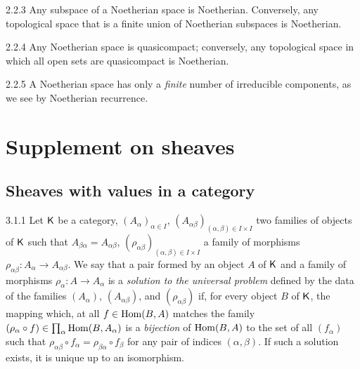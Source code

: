 \documentclass{book}
\begin{document}
\begin{env}{2.2.3}
\label{env-0.2.2.3}
Any subspace of a Noetherian space is Noetherian. Conversely,
any topological space that is a finite union of Noetherian subspaces is Noetherian.
\end{env}

\begin{env}{2.2.4}
\label{env-0.2.2.4}
Any Noetherian space is quasicompact; conversely, any  topological space in which all
open sets are quasicompact is Noetherian.
\end{env}

\begin{env}{2.2.5}
\label{env-0.2.2.5}
A Noetherian space has only a \emph{finite} number of irreducible components,
as we see by Noetherian recurrence.
\end{env}

\section{Supplement on sheaves}
\label{0-prelim-3}

\subsection{Sheaves with values in a category}
\label{0-prelim-3.1}

\begin{env}{3.1.1}
\label{env-0.3.1.1}
Let $\mathsf{K}$ be a category, $(A_\alpha)_{\alpha\in I}$,
$(A_{\alpha\beta})_{(\alpha,\beta)\in I\times I}$ two families of objects
of $\mathsf{K}$ such that $A_{\beta\alpha}=A_{\alpha\beta}$,
$(\rho_{\alpha\beta})_{(\alpha,\beta)\in I\times I}$ a family of morphisms
$\rho_{\alpha\beta}\colon A_\alpha\to A_{\alpha\beta}$. We say that a pair formed by
an object $A$ of $\mathsf{K}$ and a family of morphisms $\rho_\alpha\colon A\to A_\alpha$ 
is a \emph{solution to the universal problem} defined by the data of the families
$(A_\alpha)$, $(A_{\alpha\beta})$, and $(\rho_{\alpha\beta})$ if, for every object $B$
of $\mathsf{K}$, the mapping which, at all $f\in{\mathop{\mathrm{Hom}}\nolimits}(B,A)$ matches the
family $(\rho_\alpha\circ f)\in\prod_\alpha{\mathop{\mathrm{Hom}}\nolimits}(B,A_\alpha)$ is a \emph{bijection}
of ${\mathop{\mathrm{Hom}}\nolimits}(B,A)$ to the set of all $(f_\alpha)$ such that
$\rho_{\alpha\beta}\circ f_\alpha=\rho_{\beta\alpha}\circ f_\beta$ for any pair of
indices $(\alpha,\beta)$. If such a solution exists, it is unique up to an isomorphism.
\end{env}
\end{document}
